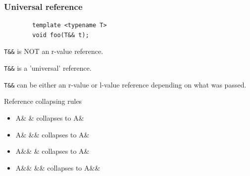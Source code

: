 \documentclass{beamer}
\begin{document}
\begin{frame}[fragile]
\frametitle{Universal reference}
    \begin{lstlisting}
        template <typename T>
        void foo(T&& t);
    \end{lstlisting}
    \pause
    \begin{block}{}
        \texttt{T\&\&} is NOT an r-value reference.
    \end{block}
    \pause
    \begin{block}{}
        \texttt{T\&\&} is a 'universal' reference.
    \end{block}

    \pause
    \begin{block}{}
        \texttt{T\&\&} can be either an r-value or l-value reference depending on what was passed.
    \end{block}
    \pause
    \begin{block}{Reference collapsing rules}
        \begin{itemize}
            \item A\&  \& collapses to A\&
            \item A\&  \&\& collapses to A\&
            \item A\&\&  \& collapses to A\&
            \item A\&\&  \&\& collapses to A\&\&
        \end{itemize}
    \end{block}
\end{frame}
\end{document}
